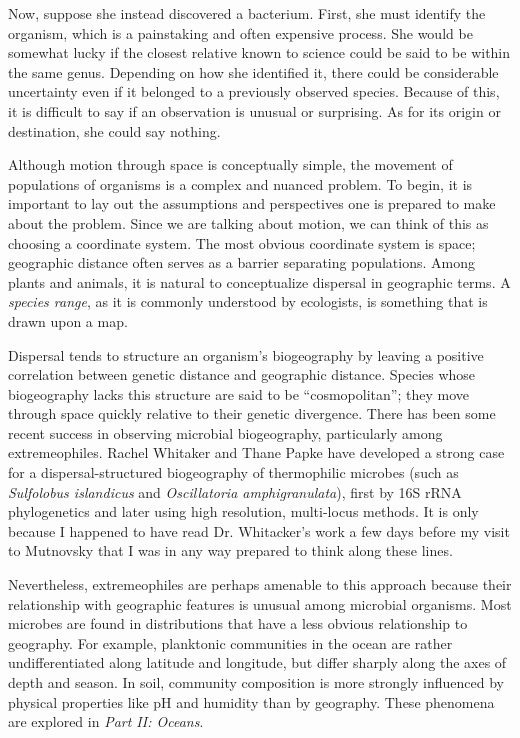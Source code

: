 Now, suppose she instead discovered a bacterium. First, she must identify the organism, which is a painstaking and often expensive process. She would be somewhat lucky if the closest relative known to science could be said to be within the same genus. Depending on how she identified it, there could be considerable uncertainty even if it belonged to a previously observed species. Because of this, it is difficult to say if an observation is unusual or surprising. As for its origin or destination, she could say nothing.

Although motion through space is conceptually simple, the movement of populations of organisms is a complex and nuanced problem. To begin, it is important to lay out the assumptions and perspectives one is prepared to make about the problem. Since we are talking about motion, we can think of this as choosing a coordinate system. The most obvious coordinate system is space; geographic distance often serves as a barrier separating populations. Among plants and animals, it is natural to conceptualize dispersal in geographic terms. A {\em species range}, as it is commonly understood by ecologists, is something that is drawn upon a map. 

Dispersal tends to structure an organism's biogeography by leaving a positive correlation between genetic distance and geographic distance. Species whose biogeography lacks this structure are said to be ``cosmopolitan''; they move through space quickly relative to their genetic divergence. There has been some recent success in observing microbial biogeography, particularly among extremeophiles. Rachel Whitaker and Thane Papke have developed a strong case for a dispersal-structured biogeography of thermophilic microbes (such as {\em Sulfolobus islandicus} and {\em Oscillatoria amphigranulata}), first by 16S rRNA phylogenetics and later using high resolution, multi-locus methods. \cite{whitaker2003geographic, whitaker2006population, bahl2011ancient, papke2003geographical, papke2015horizontal} It is only because I happened to have read Dr. Whitacker's work a few days before my visit to Mutnovsky that I was in any way prepared to think along these lines.

Nevertheless, extremeophiles are perhaps amenable to this approach because their relationship with geographic features is unusual among microbial organisms. Most microbes are found in distributions that have a less obvious relationship to geography. For example, planktonic communities in the ocean are rather undifferentiated along latitude and longitude, but differ sharply along the axes of depth and season. In soil, community composition is more strongly influenced by physical properties like pH and humidity than by geography. These phenomena are explored in {\em Part II: Oceans}.

